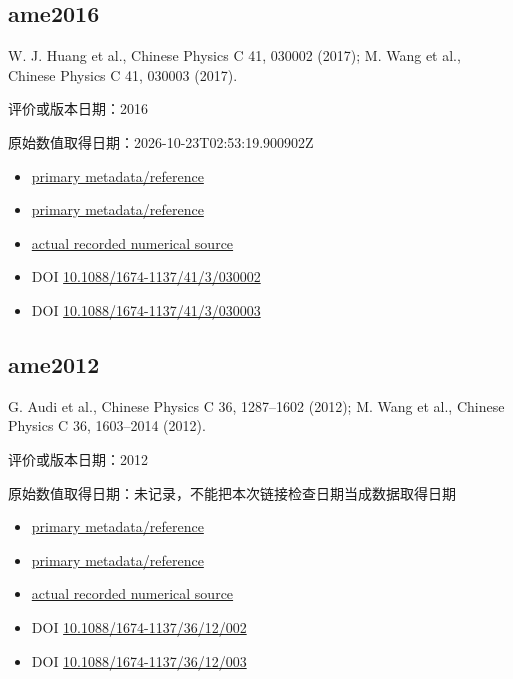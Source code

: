 \documentclass[
  11pt,
  letterpaper,
]{article}
\providecommand{\tightlist}{%
  \setlength{\itemsep}{0pt}\setlength{\parskip}{0pt}}
\begin{document}
\subsection{ame2016}\label{ame2016}

W. J. Huang et al., Chinese Physics C 41, 030002 (2017); M. Wang et al.,
Chinese Physics C 41, 030003 (2017).

评价或版本日期：2016

原始数值取得日期：2026-10-23T02:53:19.900902Z

\begin{itemize}
\tightlist
\item
  \href{https://cpc.ihep.ac.cn/article/doi/10.1088/1674-1137/41/3/030002}{primary
  metadata/reference}
\item
  \href{https://cpc.ihep.ac.cn/article/doi/10.1088/1674-1137/41/3/030003}{primary
  metadata/reference}
\item
  \href{https://www-nds.iaea.org/amdc/ame2016/mass16.txt}{actual
  recorded numerical source}
\item
  DOI
  \href{https://doi.org/10.1088/1674-1137/41/3/030002}{10.1088/1674-1137/41/3/030002}
\item
  DOI
  \href{https://doi.org/10.1088/1674-1137/41/3/030003}{10.1088/1674-1137/41/3/030003}
\end{itemize}

\subsection{ame2012}\label{ame2012}

G. Audi et al., Chinese Physics C 36, 1287--1602 (2012); M. Wang et al.,
Chinese Physics C 36, 1603--2014 (2012).

评价或版本日期：2012

原始数值取得日期：未记录，不能把本次链接检查日期当成数据取得日期

\begin{itemize}
\tightlist
\item
  \href{https://cpc.ihep.ac.cn/article/doi/10.1088/1674-1137/36/12/002}{primary
  metadata/reference}
\item
  \href{https://cpc.ihep.ac.cn/article/doi/10.1088/1674-1137/36/12/003}{primary
  metadata/reference}
\item
  \href{https://amdc.impcas.ac.cn/masstables/Ame2012/mass.mas12}{actual
  recorded numerical source}
\item
  DOI
  \href{https://doi.org/10.1088/1674-1137/36/12/002}{10.1088/1674-1137/36/12/002}
\item
  DOI
  \href{https://doi.org/10.1088/1674-1137/36/12/003}{10.1088/1674-1137/36/12/003}
\end{itemize}
\end{document}
